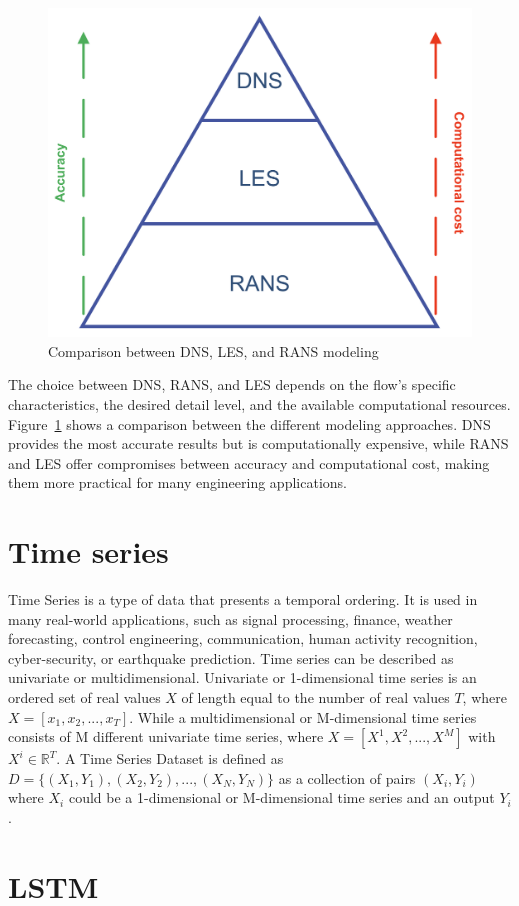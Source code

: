 \begin{figure}[H]
    \centering
    \includegraphics[width=0.4\linewidth]{images/dns_les_rans.png}
    \caption{Comparison between DNS, LES, and RANS modeling}
    \label{fig:dns_les_rans}
\end{figure}

The choice between DNS, RANS, and LES depends on the flow's specific characteristics, the desired detail level, and the available computational resources. Figure~\ref{fig:dns_les_rans} shows a comparison between the different modeling approaches. DNS provides the most accurate results but is computationally expensive, while RANS and LES offer compromises between accuracy and computational cost, making them more practical for many engineering applications.

\section{Time series}
\label{sec:TimeSeries} 

Time Series is a type of data that presents a temporal ordering. It is used in many real-world applications, such as signal processing, finance, weather forecasting, control engineering, communication, human activity recognition, cyber-security, or earthquake prediction. Time series can be described as univariate or multidimensional. Univariate or 1-dimensional time series is an ordered set of real values $X$ of length equal to the number of real values $T$, where $X = [x_1, x_2, ..., x_T]$. While a multidimensional or M-dimensional time series consists of M different univariate time series, where $X = [X^1, X^2, ..., X^M]$ with $X^i \in \mathbb{R}^T$. A Time Series Dataset is defined as $D = \{(X_1, Y_1), (X_2, Y_2), ..., (X_N, Y_N)\}$ as a collection of pairs $(X_i, Y_i)$ where $X_i$ could be a 1-dimensional or M-dimensional time series and an output $Y_i$.

\section{LSTM}
\label{sec:LSTM} 

